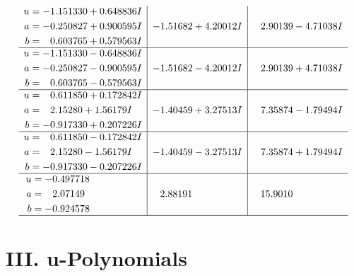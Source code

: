\documentclass[1p]{elsarticle_modified}
\theoremstyle{definition}
\begin{document}
$$\begin{array}{c|c|c}
\begin{aligned}
u &= -1.151330 + 0.648836 I \\
a &= -0.250827 + 0.900595 I \\
b &= \phantom{-}0.603765 + 0.579563 I\end{aligned}
 & -1.51682 + 4.20012 I & \phantom{-}2.90139 - 4.71038 I \\ \hline\begin{aligned}
u &= -1.151330 - 0.648836 I \\
a &= -0.250827 - 0.900595 I \\
b &= \phantom{-}0.603765 - 0.579563 I\end{aligned}
 & -1.51682 - 4.20012 I & \phantom{-}2.90139 + 4.71038 I \\ \hline\begin{aligned}
u &= \phantom{-}0.611850 + 0.172842 I \\
a &= \phantom{-}2.15280 + 1.56179 I \\
b &= -0.917330 + 0.207226 I\end{aligned}
 & -1.40459 + 3.27513 I & \phantom{-}7.35874 - 1.79494 I \\ \hline\begin{aligned}
u &= \phantom{-}0.611850 - 0.172842 I \\
a &= \phantom{-}2.15280 - 1.56179 I \\
b &= -0.917330 - 0.207226 I\end{aligned}
 & -1.40459 - 3.27513 I & \phantom{-}7.35874 + 1.79494 I \\ \hline\begin{aligned}
u &= -0.497718\phantom{ +0.000000I} \\
a &= \phantom{-}2.07149\phantom{ +0.000000I} \\
b &= -0.924578\phantom{ +0.000000I}\end{aligned}
 & \phantom{-}2.88191\phantom{ +0.000000I} & \phantom{-}15.9010\phantom{ +0.000000I}\\
 \hline 
 \end{array}$$\newpage
\newpage\renewcommand{\arraystretch}{1}
\centering \section*{ III. u-Polynomials}
\end{document}

